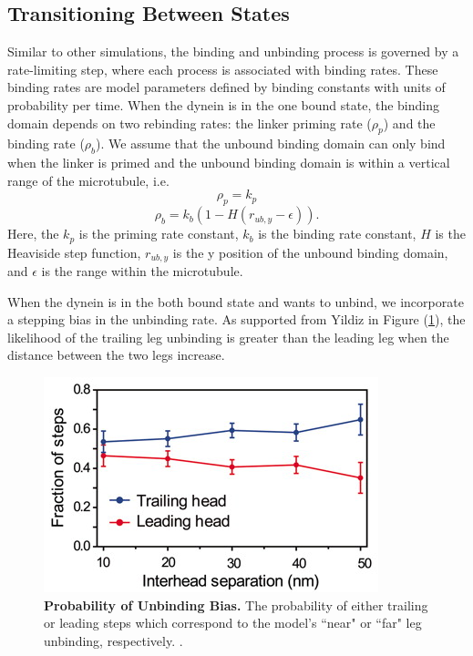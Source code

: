 \subsection{Transitioning Between States}

Similar to other simulations, the binding and unbinding process is governed by a rate-limiting step, where each process is associated with binding rates. These binding rates are model parameters defined by binding constants with units of probability per time. When the dynein is in the one bound state, the binding domain depends on two rebinding rates: the linker priming rate ($\rho_p$) and the binding rate ($\rho_b$). We assume that the unbound binding domain can only bind when the linker is primed and the unbound binding domain is within a vertical range of the microtubule, i.e.
\begin{equation}
	\rho_p=k_p
\end{equation}
\begin{equation}
	\rho_b=k_b(1-H(r_{ub,y}-\epsilon)).
\end{equation} 
Here, the $k_p$ is the priming rate constant, $k_b$ is the binding rate constant, $H$ is the Heaviside step function, $r_{ub,y}$ is the y position of the unbound binding domain, and $\epsilon$ is the range within the microtubule.

When the dynein is in the both bound state and wants to unbind, we incorporate a stepping bias in the unbinding rate. As supported from Yildiz in Figure (\ref{fig:trailingbias}), the likelihood of the trailing leg unbinding is greater than the leading leg when the distance between the two legs increase. 


\begin{figure}[H]
	\centering
	\includegraphics[width=0.6\columnwidth]{Figures/trailingbias.png}
	\caption[Probability of Unbinding Bias]{\textbf{Probability of Unbinding Bias.} The probability of either trailing or leading steps which correspond to the model's ``near" or ``far" leg unbinding, respectively. \cite{Dewitt2012}.}
	\label{fig:trailingbias}
\end{figure}


